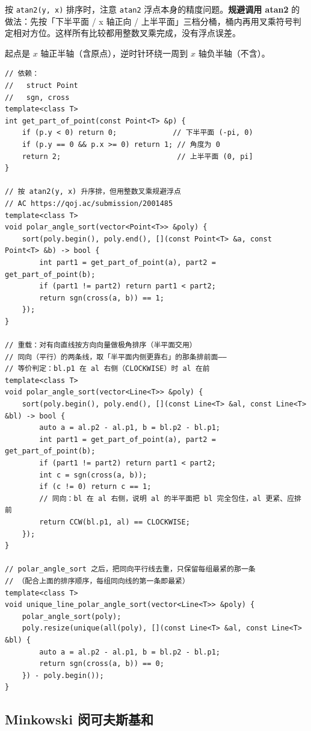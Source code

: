 		按 \texttt{atan2(y, x)} 排序时，注意 \texttt{atan2} 浮点本身的精度问题。\textbf{规避调用 atan2} 的做法：先按「下半平面 / x 轴正向 / 上半平面」三档分桶，桶内再用叉乘符号判定相对方位。这样所有比较都用整数叉乘完成，没有浮点误差。

		起点是 $x$ 轴正半轴（含原点），逆时针环绕一周到 $x$ 轴负半轴（不含）。

		\begin{verbatim}
// 依赖：
//   struct Point
//   sgn, cross
template<class T>
int get_part_of_point(const Point<T> &p) {
	if (p.y < 0) return 0;             // 下半平面 (-pi, 0)
	if (p.y == 0 && p.x >= 0) return 1; // 角度为 0
	return 2;                           // 上半平面 (0, pi]
}

// 按 atan2(y, x) 升序排，但用整数叉乘规避浮点
// AC https://qoj.ac/submission/2001485
template<class T>
void polar_angle_sort(vector<Point<T>> &poly) {
	sort(poly.begin(), poly.end(), [](const Point<T> &a, const Point<T> &b) -> bool {
		int part1 = get_part_of_point(a), part2 = get_part_of_point(b);
		if (part1 != part2) return part1 < part2;
		return sgn(cross(a, b)) == 1;
	});
}

// 重载：对有向直线按方向向量做极角排序（半平面交用）
// 同向（平行）的两条线，取「半平面内侧更靠右」的那条排前面——
// 等价判定：bl.p1 在 al 右侧（CLOCKWISE）时 al 在前
template<class T>
void polar_angle_sort(vector<Line<T>> &poly) {
	sort(poly.begin(), poly.end(), [](const Line<T> &al, const Line<T> &bl) -> bool {
		auto a = al.p2 - al.p1, b = bl.p2 - bl.p1;
		int part1 = get_part_of_point(a), part2 = get_part_of_point(b);
		if (part1 != part2) return part1 < part2;
		int c = sgn(cross(a, b));
		if (c != 0) return c == 1;
		// 同向：bl 在 al 右侧，说明 al 的半平面把 bl 完全包住，al 更紧、应排前
		return CCW(bl.p1, al) == CLOCKWISE;
	});
}

// polar_angle_sort 之后，把同向平行线去重，只保留每组最紧的那一条
// （配合上面的排序顺序，每组同向线的第一条即最紧）
template<class T>
void unique_line_polar_angle_sort(vector<Line<T>> &poly) {
	polar_angle_sort(poly);
	poly.resize(unique(all(poly), [](const Line<T> &al, const Line<T> &bl) {
		auto a = al.p2 - al.p1, b = bl.p2 - bl.p1;
		return sgn(cross(a, b)) == 0;
	}) - poly.begin());
}
		\end{verbatim}

		\subsection{Minkowski 闵可夫斯基和}

